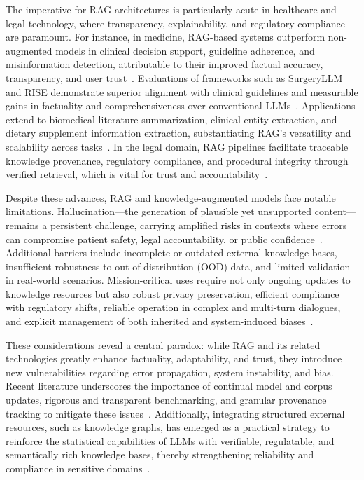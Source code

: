 \documentclass[sigconf]{acmart}
\begin{document}
The imperative for RAG architectures is particularly acute in healthcare and legal technology, where transparency, explainability, and regulatory compliance are paramount. For instance, in medicine, RAG-based systems outperform non-augmented models in clinical decision support, guideline adherence, and misinformation detection, attributable to their improved factual accuracy, transparency, and user trust~\cite{ref1,ref2,ref3,ref4,ref5,ref6,ref7,ref8,ref29,ref31,ref42,ref48,ref51,ref52,ref54,ref55,ref63}. Evaluations of frameworks such as SurgeryLLM and RISE demonstrate superior alignment with clinical guidelines and measurable gains in factuality and comprehensiveness over conventional LLMs~\cite{ref1,ref55}. Applications extend to biomedical literature summarization, clinical entity extraction, and dietary supplement information extraction, substantiating RAG’s versatility and scalability across tasks~\cite{ref2,ref3,ref6,ref7,ref29,ref31,ref52}. In the legal domain, RAG pipelines facilitate traceable knowledge provenance, regulatory compliance, and procedural integrity through verified retrieval, which is vital for trust and accountability~\cite{ref4,ref5,ref8,ref10,ref14,ref16,ref63}.

Despite these advances, RAG and knowledge-augmented models face notable limitations. Hallucination—the generation of plausible yet unsupported content—remains a persistent challenge, carrying amplified risks in contexts where errors can compromise patient safety, legal accountability, or public confidence~\cite{ref15,ref38,ref45,ref46,ref47,ref50,ref52,ref54,ref55,ref64}. Additional barriers include incomplete or outdated external knowledge bases, insufficient robustness to out-of-distribution (OOD) data, and limited validation in real-world scenarios. Mission-critical uses require not only ongoing updates to knowledge resources but also robust privacy preservation, efficient compliance with regulatory shifts, reliable operation in complex and multi-turn dialogues, and explicit management of both inherited and system-induced biases~\cite{ref15,ref38,ref45,ref46,ref47,ref50,ref52,ref54,ref55,ref64}.

These considerations reveal a central paradox: while RAG and its related technologies greatly enhance factuality, adaptability, and trust, they introduce new vulnerabilities regarding error propagation, system instability, and bias. Recent literature underscores the importance of continual model and corpus updates, rigorous and transparent benchmarking, and granular provenance tracking to mitigate these issues~\cite{ref15,ref54,ref55}. Additionally, integrating structured external resources, such as knowledge graphs, has emerged as a practical strategy to reinforce the statistical capabilities of LLMs with verifiable, regulatable, and semantically rich knowledge bases, thereby strengthening reliability and compliance in sensitive domains~\cite{ref16,ref29,ref47,ref48}.
\end{document}

